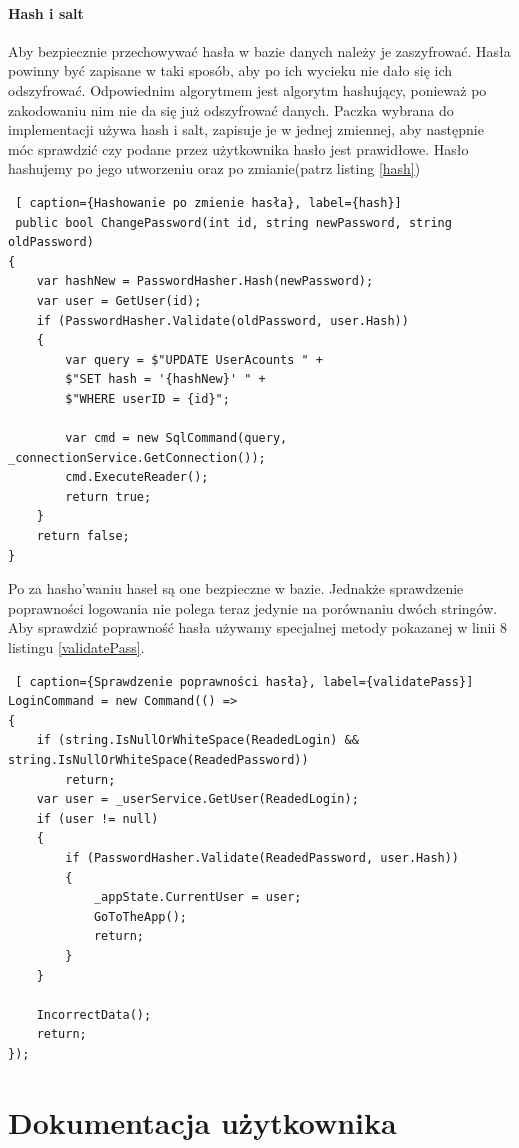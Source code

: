 \documentclass[12pt,oneside]{report}
\begin{document}
\subsubsection{Hash i salt}
Aby bezpiecznie przechowywać hasła w bazie danych należy je zaszyfrować. Hasła powinny być zapisane w taki sposób, aby po ich wycieku nie dało się ich odszyfrować. Odpowiednim algorytmem jest algorytm hashujący, ponieważ po zakodowaniu nim nie da się już odszyfrować danych. Paczka wybrana do implementacji używa hash i salt, zapisuje je w jednej zmiennej, aby następnie móc sprawdzić czy podane przez użytkownika hasło jest prawidłowe. Hasło hashujemy po jego utworzeniu oraz po zmianie(patrz listing \ref{hash})
\newline
\begin{lstlisting} [ caption={Hashowanie po zmienie hasła}, label={hash}]	
 public bool ChangePassword(int id, string newPassword, string oldPassword)
{
	var hashNew = PasswordHasher.Hash(newPassword);
	var user = GetUser(id);
	if (PasswordHasher.Validate(oldPassword, user.Hash))
	{
		var query = $"UPDATE UserAcounts " +
		$"SET hash = '{hashNew}' " +
		$"WHERE userID = {id}";
		
		var cmd = new SqlCommand(query, _connectionService.GetConnection());
		cmd.ExecuteReader();
		return true;
	}
	return false;
}
\end{lstlisting}
Po za hasho'waniu haseł są one bezpieczne w bazie. Jednakże sprawdzenie poprawności logowania nie polega teraz jedynie na porównaniu dwóch stringów. Aby sprawdzić poprawność hasła używamy specjalnej metody pokazanej w linii 8 listingu \ref{validatePass}.
\newline
\begin{lstlisting} [ caption={Sprawdzenie poprawności hasła}, label={validatePass}]	
LoginCommand = new Command(() =>
{
	if (string.IsNullOrWhiteSpace(ReadedLogin) && string.IsNullOrWhiteSpace(ReadedPassword))
		return;
	var user = _userService.GetUser(ReadedLogin);
	if (user != null)
	{
		if (PasswordHasher.Validate(ReadedPassword, user.Hash))
		{
			_appState.CurrentUser = user;
			GoToTheApp();
			return;
		}
	}
	
	IncorrectData();
	return;
});	
\end{lstlisting}
\newpage
\chapter{Dokumentacja użytkownika}
\end{document}
